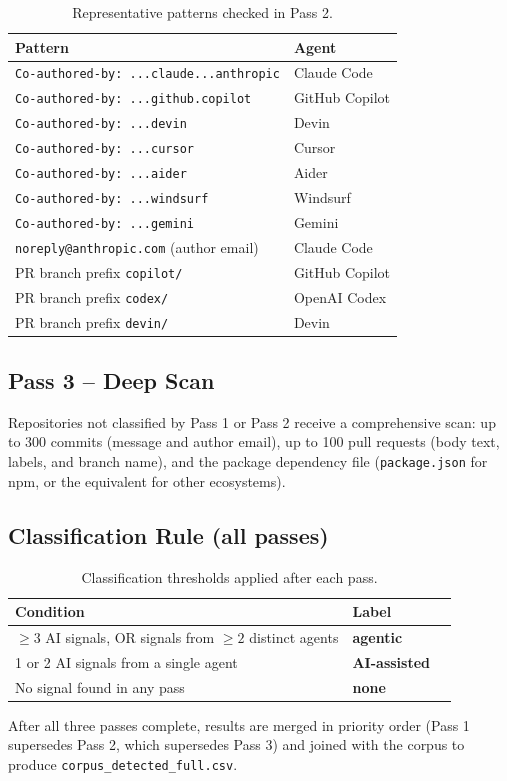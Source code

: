 \documentclass[11pt, a4paper]{article}
\begin{document}
\begin{table}[h]
\centering
\caption{Representative patterns checked in Pass 2.}
\begin{tabular}{@{}ll@{}}
\toprule
\textbf{Pattern} & \textbf{Agent} \\
\midrule
\texttt{Co-authored-by: ...claude...anthropic} & Claude Code \\
\texttt{Co-authored-by: ...github.copilot}     & GitHub Copilot \\
\texttt{Co-authored-by: ...devin}              & Devin \\
\texttt{Co-authored-by: ...cursor}             & Cursor \\
\texttt{Co-authored-by: ...aider}              & Aider \\
\texttt{Co-authored-by: ...windsurf}           & Windsurf \\
\texttt{Co-authored-by: ...gemini}             & Gemini \\
\texttt{noreply@anthropic.com} (author email)  & Claude Code \\
PR branch prefix \texttt{copilot/}            & GitHub Copilot \\
PR branch prefix \texttt{codex/}              & OpenAI Codex \\
PR branch prefix \texttt{devin/}              & Devin \\
\bottomrule
\end{tabular}
\end{table}

\subsection*{Pass 3 -- Deep Scan}

Repositories not classified by Pass 1 or Pass 2 receive a comprehensive scan:
up to 300 commits (message and author email), up to 100 pull requests (body
text, labels, and branch name), and the package dependency file
(\texttt{package.json} for npm, or the equivalent for other ecosystems).

\subsection*{Classification Rule (all passes)}

\begin{table}[h]
\centering
\caption{Classification thresholds applied after each pass.}
\begin{tabular}{@{}lll@{}}
\toprule
\textbf{Condition} & \textbf{Label} \\
\midrule
$\geq 3$ AI signals, OR signals from $\geq 2$ distinct agents & \textbf{agentic} \\
1 or 2 AI signals from a single agent                         & \textbf{AI-assisted} \\
No signal found in any pass                                   & \textbf{none} \\
\bottomrule
\end{tabular}
\end{table}

After all three passes complete, results are merged in priority order (Pass 1
supersedes Pass 2, which supersedes Pass 3) and joined with the corpus to
produce \texttt{corpus\_detected\_full.csv}.
\end{document}
